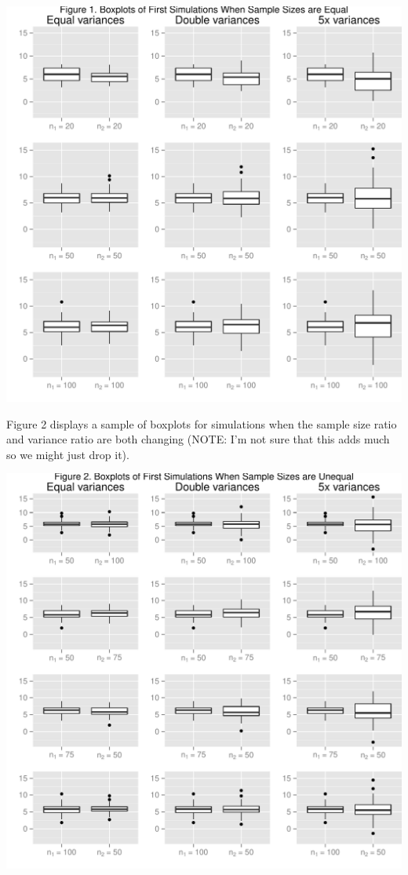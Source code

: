 \documentclass[man,a4paper,noextraspace]{apa6}\usepackage[]{graphicx}\usepackage[]{color}
\makeatletter
\def\maxwidth{ %
  \ifdim\Gin@nat@width>\linewidth
    \linewidth
  \else
    \Gin@nat@width
  \fi
}
\newenvironment{knitrout}{}{} %
\makeatother
\begin{document}
\begin{knitrout}
\color{fgcolor}
\includegraphics[width=\maxwidth]{figure/equalNboxplots} 

\end{knitrout}

Figure 2 displays a sample of boxplots for simulations when the sample size ratio and variance ratio are both changing (NOTE: I'm not sure that this adds much so we might just drop it).

\begin{knitrout}
\color{fgcolor}
\includegraphics[width=\maxwidth]{figure/differentNboxplots} 

\end{knitrout}
\end{document}

